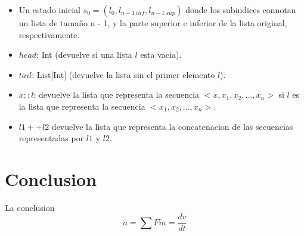 \documentclass[12pt, a4paper]{article}
\begin{document}
\begin{itemize}
  \item Un estado inicial $s_0 = (l_0, l_{n-1~inf}, l_{n-1~sup})$  donde los subindices connotan un lista de tamaño n - 1, y la parte superior e inferior de la lista original, respectivamente.
  \item $head$: Int (devuelve si una lista $l$ esta vacia).
  \item $tail$: List[Int] (devuelve la lista sin el primer elemento $l$).
  \item $x::l$: devuelve la lista que representa la secuencia $<x,x_1,x_2,...,x_n>$ si $l$ es la lista que representa
  la secuencia $<x_1,x_2,...,x_n>$.
  \item $l1 ++ l2$ devuelve la lista que representa la concatenacion de las secuencias representadas por $l1$ y $l2$.
\end{itemize}
  
\section{Conclusion}
La conclusion
\newpage{}
\begin{displaymath}
 a = \sum F \dot m = \frac{dv}{dt}
\end{displaymath}
\end{document}
